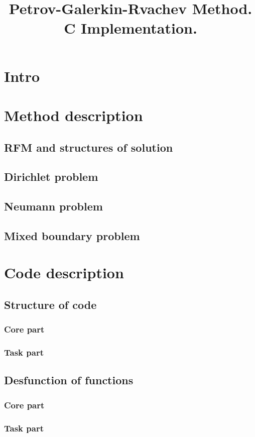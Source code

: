 \documentclass[a4paper,12pt]{article}
\title{Petrov-Galerkin-Rvachev Method.\\C Implementation.}
\author{}
\date{}
\begin{document}
\maketitle
\section{Intro}

\section{Method description}
\subsection{RFM and structures of solution}
\subsection{Dirichlet problem}
\subsection{Neumann problem}
\subsection{Mixed boundary problem}


\section{Code description}
\subsection{Structure of code}
\subsubsection{Core part}
\subsubsection{Task part}
\subsection{Desfunction of functions}
\subsubsection{Core part}
\subsubsection{Task part}
\end{document}
